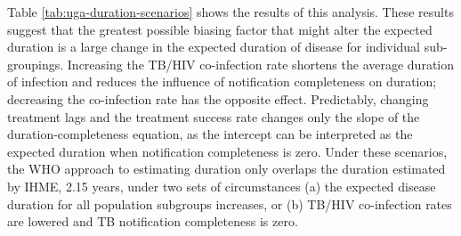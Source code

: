 \documentclass[
]{report}
\begin{document}
Table \ref{tab:uga-duration-scenarios} shows the results of this analysis. These results suggest that the greatest possible biasing factor that might alter the expected duration is a large change in the expected duration of disease for individual sub-groupings. Increasing the TB/HIV co-infection rate shortens the average duration of infection and reduces the influence of notification completeness on duration; decreasing the co-infection rate has the opposite effect. Predictably, changing treatment lags and the treatment success rate changes only the slope of the duration-completeness equation, as the intercept can be interpreted as the expected duration when notification completeness is zero. Under these scenarios, the WHO approach to estimating duration only overlaps the duration estimated by IHME, 2.15 years, under two sets of circumstances (a) the expected disease duration for all population subgroups increases, or (b) TB/HIV co-infection rates are lowered and TB notification completeness is zero.
\end{document}
